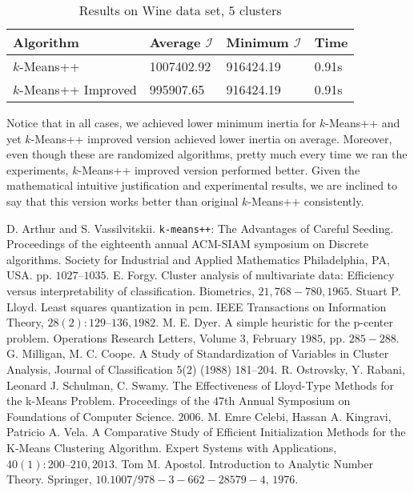 \documentclass[twoside, 11pt]{article}
\newcommand{\I}{\mathcal{I}}
\begin{document}
		\begin{table}
			\begin{center}
				\begin{tabular}{|l|l|l|l|}
					\hline
					Algorithm & Average $\I$& Minimum $\I$& Time\\\hline
					$k$-Means++ & 1007402.92& 916424.19& 0.91s\\\hline
					$k$-Means++ Improved& 995907.65& 916424.19& 0.91s\\\hline
				\end{tabular}
				\caption{Results on Wine data set, $5$ clusters}
				\label{tbl:wine2}
			\end{center}
		\end{table}
	Notice that in all cases, we achieved lower minimum inertia for $k$-Means++ and yet $k$-Means++ improved version achieved lower inertia on average. Moreover, even though these are randomized algorithms, pretty much every time we ran the experiments, $k$-Means++ improved version performed better. Given the mathematical intuitive justification and experimental results, we are inclined to say that this version works better than original $k$-Means++ consistently.
	\begin{thebibliography}{99}
		 D. Arthur and S. Vassilvitskii. \texttt{k-means++}: The Advantages of Careful Seeding. Proceedings of the eighteenth annual ACM-SIAM symposium on Discrete algorithms. Society for Industrial and Applied Mathematics Philadelphia, PA, USA. pp. $1027–1035$.
		 E. Forgy. Cluster analysis of multivariate data: Efficiency versus interpretability of classification. Biometrics, $21, 768-780, 1965$.
		 Stuart P. Lloyd. Least squares quantization in pcm. IEEE Transactions on Information Theory, $28(2):129–136, 1982$.
		 M. E. Dyer. A simple heuristic for the p-center problem. Operations Research Letters, Volume $3$, February $1985$, pp. $285-288$.
		 G. Milligan, M. C. Coope. A Study of Standardization of Variables in Cluster Analysis, Journal of Classification 5(2) (1988) 181–204.
		 R. Ostrovsky, Y. Rabani, Leonard J. Schulman, C. Swamy. The Effectiveness of Lloyd-Type Methods for the k-Means Problem. Proceedings of the $47$th Annual Symposium on Foundations of Computer Science. $2006$.
		 M. Emre Celebi, Hassan A. Kingravi, Patricio A. Vela. A Comparative Study of Efficient Initialization Methods for the K-Means Clustering Algorithm. Expert Systems with Applications, $40(1): 200–210, 2013$.
		 Tom M. Apostol. Introduction to Analytic Number Theory. Springer, $10.1007/978-3-662-28579-4$, $1976$.
	\end{thebibliography}
\end{document}
